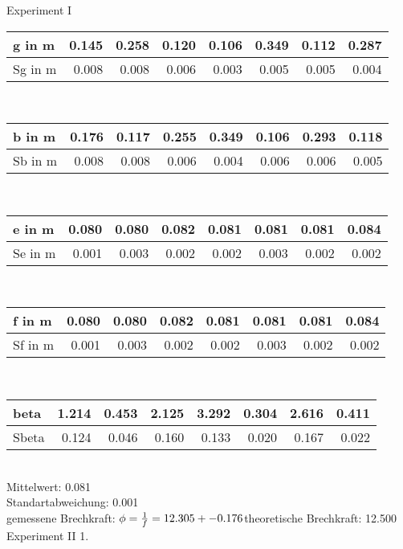 Experiment I \\ \vspace{3 mm} \normalsize \vspace{3 mm}
	\begin{tabular}{| l | r|r|r|r|r|r|r|}
	\hline
        g in m& 0.145 & 0.258 & 0.120 & 0.106 & 0.349 & 0.112 & 0.287 \\ \hline Sg in m& 0.008 & 0.008 & 0.006 & 0.003 & 0.005 & 0.005 & 0.004 \\ \hline
	\end{tabular} \\ \vspace{3 mm} \normalsize \vspace{3 mm}
	\begin{tabular}{| l | r|r|r|r|r|r|r|}
	\hline
        b in m& 0.176 & 0.117 & 0.255 & 0.349 & 0.106 & 0.293 & 0.118 \\ \hline Sb in m& 0.008 & 0.008 & 0.006 & 0.004 & 0.006 & 0.006 & 0.005 \\ \hline
	\end{tabular} \\ \vspace{3 mm} \normalsize \vspace{3 mm}
	\begin{tabular}{| l | r|r|r|r|r|r|r|}
	\hline
        e in m& 0.080 & 0.080 & 0.082 & 0.081 & 0.081 & 0.081 & 0.084 \\ \hline Se in m& 0.001 & 0.003 & 0.002 & 0.002 & 0.003 & 0.002 & 0.002 \\ \hline
	\end{tabular} \\ \vspace{3 mm} \normalsize \vspace{3 mm}
	\begin{tabular}{| l | r|r|r|r|r|r|r|}
	\hline
        f in m& 0.080 & 0.080 & 0.082 & 0.081 & 0.081 & 0.081 & 0.084 \\ \hline Sf in m& 0.001 & 0.003 & 0.002 & 0.002 & 0.003 & 0.002 & 0.002 \\ \hline
	\end{tabular} \\ \vspace{3 mm} \normalsize \vspace{3 mm}
	\begin{tabular}{| l | r|r|r|r|r|r|r|}
	\hline
        beta& 1.214 & 0.453 & 2.125 & 3.292 & 0.304 & 2.616 & 0.411 \\ \hline Sbeta& 0.124 & 0.046 & 0.160 & 0.133 & 0.020 & 0.167 & 0.022 \\ \hline
	\end{tabular} \\ Mittelwert: 0.081\\Standartabweichung: 0.001\\gemessene Brechkraft: $\phi=\frac{1}{f}=12.305 +- 0.176\\ $theoretische Brechkraft: 12.500\\ Experiment II 1. \\ \vspace{3 mm} \normalsize \vspace{3 mm}
